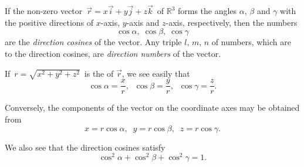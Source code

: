\documentclass[12pt]{article}
\theoremstyle{definition}
\begin{document}
If the non-zero vector \,$\vec{r} = x\vec{i}+y\vec{j}+z\vec{k}$\, of $\mathbb{R}^3$ forms the angles $\alpha$, $\beta$ and $\gamma$ with the positive directions of $x$-axis, $y$-axis and $z$-axis, respectively, then the numbers
$$\cos{\alpha},\; \cos{\beta},\; \cos{\gamma}$$
are the {\em direction cosines} of the vector.  Any triple $l,\,m,\,n$ of numbers, which are  to the direction cosines, are {\em direction numbers} of the vector.

If\, $r = \sqrt{x^2+y^2+z^2}$\, is the  of $\vec{r}$, we see easily that
$$\cos{\alpha} = \frac{x}{r},\;\; \cos{\beta} = \frac{y}{r},\;\; \cos{\gamma} = \frac{z}{r}.$$

Conversely, the components of the vector on the coordinate axes may be obtained  from
$$x = r\cos{\alpha},\;\; y = r\cos{\beta},\;\; z = r\cos{\gamma}.$$

We also see that the direction cosines satisfy
$$\cos^2\alpha+\cos^2\beta+\cos^2\gamma = 1.$$
\end{document}
